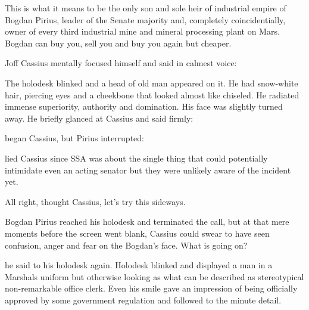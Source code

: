 This is what it means to be the only son and sole heir of industrial empire of Bogdan Pirius, leader of the Senate majority and, completely coincidentially, owner of every third industrial mine and mineral processing plant on Mars. Bogdan can buy you, sell you and buy you again but cheaper.

Joff Cassius mentally focused himself and said in calmest voice:


The holodesk blinked and a head of old man appeared on it. He had snow-white hair, piercing eyes and a cheekbone that looked almost like chiseled. He radiated immense superiority, authority and domination. His face was slightly turned away. He briefly glanced at Cassius and said firmly:


 began Cassius, but Pirius interrupted:


 lied Cassius since SSA was about the single thing that could potentially intimidate even an acting senator but they were unlikely aware of the incident yet.


All right, thought Cassius, let's try this sideways.


Bogdan Pirius reached his holodesk and terminated the call, but at that mere moments before the screen went blank, Cassius could swear to have seen confusion, anger and fear on the Bogdan's face. What is going on?

 he said to his holodesk again. Holodesk blinked and displayed a man in a Marshals uniform but otherwise looking as what can be described as stereotypical non-remarkable office clerk. Even his smile gave an impression of being officially approved by some government regulation and followed to the minute detail.


